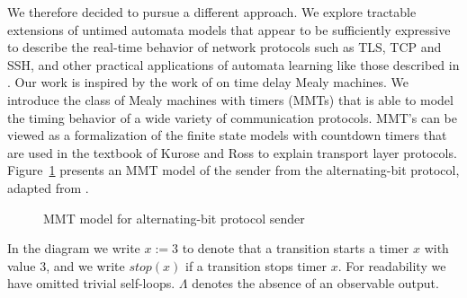 We therefore decided to pursue a different approach. We explore tractable extensions of untimed automata models that appear to
be sufficiently expressive to describe the real-time behavior of network protocols such as TLS, TCP and SSH, and other
practical applications of automata learning like those described in \cite{Vaa17}.
%
Our work is inspired by the work of \cite{CCF16} on time delay Mealy machines.
We introduce the class of Mealy machines with timers (MMTs) that 
is able to model the timing behavior of a wide variety of communication protocols.
MMT's can be viewed as a formalization of the finite state models with countdown timers that are used in the textbook of
Kurose and Ross \cite{KR13} to explain transport layer protocols.
Figure~\ref{fig:abp} presents an MMT model of the sender from 
the alternating-bit protocol, adapted from \cite[Figure 3.15]{KR13}.
\begin{figure}[h]
\centering
\vspace{-2 em}
\caption{MMT model for alternating-bit protocol sender}
\label{fig:abp}
\end{figure}
In the diagram we write $x :=3$ to denote that a transition starts a timer $x$ with value $3$,
and we write $\mathit{stop}(x)$ if a transition stops timer $x$.
For readability we have omitted trivial self-loops.
\iflong
$\Lambda$ denotes the absence of an observable output. 


